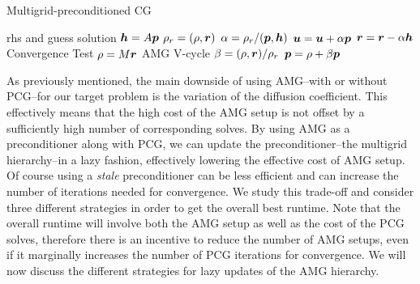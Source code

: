 \begin{algorithm}[ht] 
  \caption{Multigrid-preconditioned CG} \label{alg:pcg} 
  \begin{algorithmic}[1]
    \Require rhs and guess
    \Ensure  solution
    \State $\boldsymbol h = A \boldsymbol p$ 											%
    \State $\rho_r = (\rho, \boldsymbol r)$								%
    \State $\alpha = \rho_r / ( \boldsymbol p, \boldsymbol h )$		%
    \State $\boldsymbol u = \boldsymbol u + \alpha\boldsymbol p$					%
    \State $\boldsymbol r = \boldsymbol r - \alpha\boldsymbol h$					%
    \State Convergence Test
    \State $\rho = M\boldsymbol r$ 												\Comment AMG V-cycle %
    \State $\beta = (\rho, \boldsymbol r) / \rho_r$				%
    \State $\boldsymbol p = \rho + \beta\boldsymbol p$						%
    \EndWhile
  \end{algorithmic}
\end{algorithm}

As previously mentioned, the main downside of using AMG--with or without PCG--for our target problem is
the variation of the diffusion coefficient. This effectively means that the high cost of the AMG setup
is not offset by a sufficiently high number of corresponding solves. By using AMG as a preconditioner
along with PCG, we can update the preconditioner--the multigrid hierarchy--in a lazy fashion,
effectively lowering the effective cost of AMG setup. Of course using a {\em stale} preconditioner can
be less efficient and can increase the number of iterations needed for convergence. We study this
trade-off and consider three different strategies in order to get the overall best runtime.
Note that the overall runtime will involve both the AMG setup as well as the cost of the PCG solves,
therefore there is an incentive to reduce the number of AMG setups, even if it marginally increases
the number of PCG iterations for convergence. We will now discuss the different strategies for lazy
updates of the AMG hierarchy.


